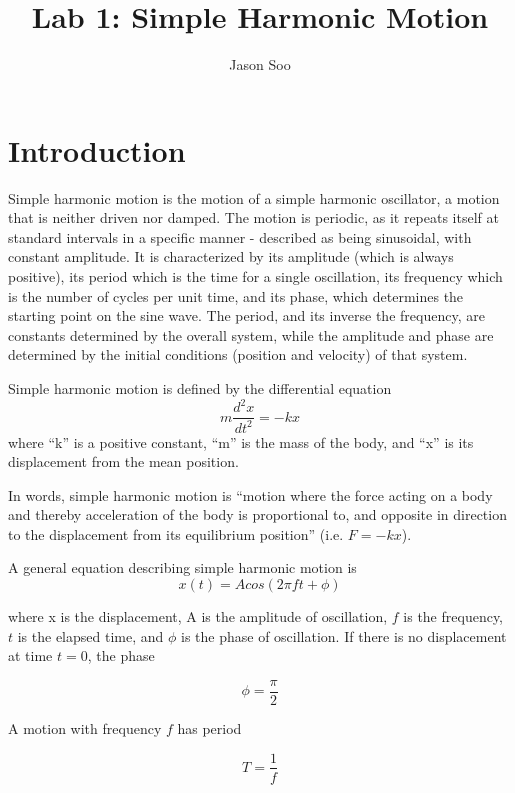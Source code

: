 \documentclass[twocolumn]{article}
\title{Lab 1: Simple Harmonic Motion}
\author{Jason Soo}
\begin{document}
\maketitle
\section{Introduction} %
\label{sec:introduction}
Simple harmonic motion is the motion of a simple harmonic oscillator, a motion that is neither driven nor damped. The motion is periodic, as it repeats itself at standard intervals in a specific manner - described as being sinusoidal, with constant amplitude. It is characterized by its amplitude (which is always positive), its period which is the time for a single oscillation, its frequency which is the number of cycles per unit time, and its phase, which determines the starting point on the sine wave. The period, and its inverse the frequency, are constants determined by the overall system, while the amplitude and phase are determined by the initial conditions (position and velocity) of that system.

Simple harmonic motion is defined by the differential equation
\begin{equation}
	m\frac{d^2x}{dt^2} = -kx
\end{equation}
where ``k'' is a positive constant, ``m'' is the mass of the body, and ``x'' is its displacement from the mean position.

In words, simple harmonic motion is ``motion where the force acting on a body and thereby acceleration of the body is proportional to, and opposite in direction to the displacement from its equilibrium position'' (i.e. $F = -kx$).

A general equation describing simple harmonic motion is 
\begin{equation}
	x(t) = Acos(2\pi ft + \phi)
\end{equation}

where x is the displacement, A is the amplitude of oscillation, $f$ is the frequency, $t$ is the elapsed time, and $\phi$ is the phase of oscillation. If there is no displacement at time $t = 0$, the phase 

\begin{equation}
	\phi = \frac{\pi}{2}
\end{equation}

A motion with frequency $f$ has period

\begin{equation}
	T = \frac{1}{f}
\end{equation}
\end{document}
